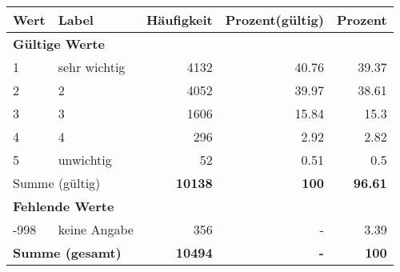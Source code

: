      \begin{longtable}{lXrrr}
     \toprule
     \textbf{Wert} & \textbf{Label} & \textbf{Häufigkeit} & \textbf{Prozent(gültig)} & \textbf{Prozent} \\
     \endhead
     \midrule
     \multicolumn{5}{l}{\textbf{Gültige Werte}}\\

     1 &
     \multicolumn{1}{X}{ sehr wichtig   } &


       \num{4132} &
       \num[round-mode=places,round-precision=2]{40.76} &
         \num[round-mode=places,round-precision=2]{39.37} \\

     2 &
     \multicolumn{1}{X}{ 2   } &


       \num{4052} &
       \num[round-mode=places,round-precision=2]{39.97} &
         \num[round-mode=places,round-precision=2]{38.61} \\

     3 &
     \multicolumn{1}{X}{ 3   } &


       \num{1606} &
       \num[round-mode=places,round-precision=2]{15.84} &
         \num[round-mode=places,round-precision=2]{15.3} \\

     4 &
     \multicolumn{1}{X}{ 4   } &


       \num{296} &
       \num[round-mode=places,round-precision=2]{2.92} &
         \num[round-mode=places,round-precision=2]{2.82} \\

     5 &
     \multicolumn{1}{X}{ unwichtig   } &


       \num{52} &
       \num[round-mode=places,round-precision=2]{0.51} &
         \num[round-mode=places,round-precision=2]{0.5} \\
     \midrule
     \multicolumn{2}{l}{Summe (gültig)} &
       \textbf{\num{10138}} &
     \textbf{\num{100}} &
       \textbf{\num[round-mode=places,round-precision=2]{96.61}} \\
     \multicolumn{5}{l}{\textbf{Fehlende Werte}}\\
       -998 &
       keine Angabe &
         \num{356} &
        - &
         \num[round-mode=places,round-precision=2]{3.39} \\
     \midrule
     \multicolumn{2}{l}{\textbf{Summe (gesamt)}} &
          \textbf{\num{10494}} &
        \textbf{-} &
        \textbf{\num{100}} \\
     \bottomrule
     \end{longtable}
     
